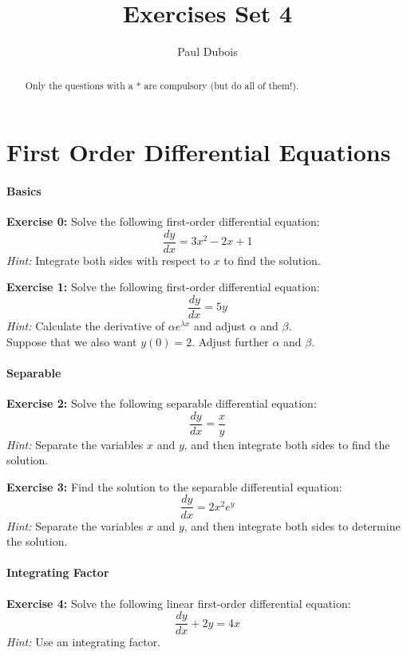 \documentclass[]{article}
\title{Exercises Set 4}
\author{Paul Dubois}
\begin{document}
	\maketitle
	
	\begin{abstract}
		Only the questions with a * are compulsory (but do all of them!).
	\end{abstract}	
	
	\section{First Order Differential Equations}
	\paragraph{Basics}\mbox{}
	
	\textbf{Exercise 0:}
	Solve the following first-order differential equation:
	\[
	\frac{dy}{dx} = 3x^2 - 2x + 1
	\]
	\textit{Hint:} Integrate both sides with respect to \(x\) to find the solution.
	
	\textbf{Exercise 1:}
	Solve the following first-order differential equation:
	\[
	\frac{dy}{dx} = 5y
	\]
	\textit{Hint:} Calculate the derivative of $\alpha e^{\lambda x}$ and adjust $\alpha$ and $\beta$.\\
	Suppose that we also want $y(0) = 2$. Adjust further $\alpha$ and $\beta$.
	
	
	\paragraph{Separable}\mbox{}
	
	\textbf{Exercise 2:}
	Solve the following separable differential equation:
	\[
	\frac{dy}{dx} = \frac{x}{y}
	\]
	\textit{Hint:} Separate the variables \(x\) and \(y\), and then integrate both sides to find the solution.
	
	\textbf{Exercise 3:}
	Find the solution to the separable differential equation:
	\[
	\frac{dy}{dx} = 2x^2 e^y
	\]
	\textit{Hint:} Separate the variables \(x\) and \(y\), and then integrate both sides to determine the solution.
	
	\paragraph{Integrating Factor}\mbox{}
	
	\textbf{Exercise 4:}
	Solve the following linear first-order differential equation:
	\[
	\frac{dy}{dx} + 2y = 4x
	\]
	\textit{Hint:} Use an integrating factor.
	
\end{document}
